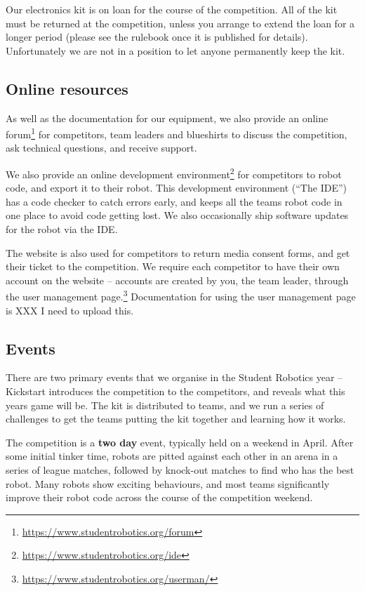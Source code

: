 \documentclass[a4paper]{article}
\begin{document}
Our electronics kit is on loan for the course of the competition. All of the
kit must be returned at the competition, unless you arrange to extend the loan
for a longer period (please see the rulebook once it is published for details).
Unfortunately we are not in a position to let anyone permanently keep the kit.

\subsection*{Online resources}

As well as the documentation for our equipment, we also provide an online
forum\footnote{\url{https://www.studentrobotics.org/forum}} for competitors,
team leaders and blueshirts to discuss the competition, ask technical questions,
and receive support.

We also provide an online development
environment\footnote{\url{https://www.studentrobotics.org/ide}} for competitors
to robot code, and export it to their robot. This development environment
(``The IDE'') has a code checker to catch errors early, and keeps all the
teams robot code in one place to avoid code getting lost. We also occasionally
ship software updates for the robot via the IDE.

The website is also used for competitors to return media consent forms, and
get their ticket to the competition. We require each competitor to have their
own account on the website -- accounts are created by you, the team leader,
through the user management
page.\footnote{\url{https://www.studentrobotics.org/userman/}} Documentation
for using the user management page is XXX I need to upload this.

\subsection*{Events}

There are two primary events that we organise in the Student Robotics year --
Kickstart introduces the competition to the competitors, and reveals what this
years game will be. The kit is distributed to teams, and we run a series of
challenges to get the teams putting the kit together and learning how it works.

The competition is a \textbf{two day} event, typically held on a weekend in
April. After some initial tinker time, robots are pitted against each other in
an arena in a series of league matches, followed by knock-out matches to find
who has the best robot. Many robots show exciting behaviours, and most teams
significantly improve their robot code across the course of the competition
weekend.
\end{document}
